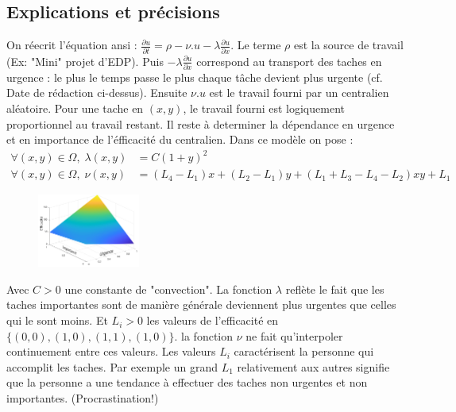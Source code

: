 \documentclass[french]{article}
\begin{document}
    \subsection{Explications et précisions}
    On réecrit l'équation ansi : $\frac{\partial u}{\partial t} = \rho - \nu.u - \lambda\frac{\partial u}{\partial x}$. 
    Le terme $\rho$ est la source de travail (Ex: "Mini" projet d'EDP). Puis $ - \lambda\frac{\partial u}{\partial x}$ 
    correspond au transport des taches en urgence : le plus le temps passe le plus chaque tâche devient plus urgente 
    (cf. Date de rédaction ci-dessus). Ensuite $\nu.u$ est le travail fourni par un centralien aléatoire. Pour une tache en $(x,y)$, le travail fourni 
    est logiquement proportionnel au travail restant. Il reste à determiner la dépendance en urgence et en importance 
    de l'éfficacité du centralien. Dans ce modèle on pose :
    \begin{align}
        \forall(x,y)\in\Omega, \; \lambda(x,y) &= C(1+y)^2 \\
        \forall(x,y)\in\Omega, \; \nu(x,y) &= (L_4-L_1)x+(L_2-L_1)y+(L_1+L_3-L_4-L_2)xy+L_1
    \end{align}
    

    \begin{figure}
        \begin{center}
            \includegraphics[width=0.30\textwidth]{Figures/Efficacite.png}
        \end{center}
        \vspace{-40pt}
    \end{figure}

    Avec $C > 0$ une constante de "convection". La fonction $\lambda$ reflète le fait 
    que les taches importantes sont de manière générale deviennent plus urgentes que celles qui le sont moins.
    Et $L_i > 0$ les valeurs de l'efficacité en $\{(0,0),(1,0),(1,1),(1,0)\}$. la fonction 
    $\nu$ ne fait qu'interpoler continuement entre ces valeurs. Les valeurs $L_i$ 
    caractérisent la personne qui accomplit les taches. Par exemple un grand $L_1$ 
    relativement aux autres signifie que  la personne a une tendance à effectuer des 
    taches non urgentes et non importantes. (Procrastination!)
    
\end{document}
